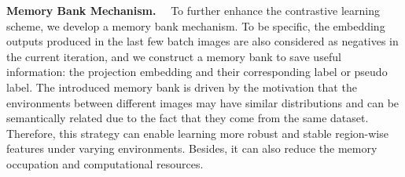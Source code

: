 \documentclass{article}
\renewcommand{\paragraph}[1]{\noindent\textbf{#1}~~}
\begin{document}
\paragraph{Memory Bank Mechanism.}
To further enhance the contrastive learning scheme, we develop a memory bank mechanism. To be specific, the embedding outputs produced in the last few batch images are also considered as negatives in the current iteration, and we construct a memory bank to save useful information:  the projection embedding and their corresponding label or pseudo label.   The introduced memory bank is driven by the motivation that the environments between different images may have similar distributions and can be semantically related due to the fact that they come from the same dataset. Therefore, this strategy can enable learning more robust and stable region-wise features under varying environments. Besides, it can also reduce the memory occupation and computational resources.   
\end{document}

